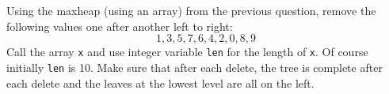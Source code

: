   Using the maxheap (using an array) from the previous question,
  remove the following values one after another left to right:
  \[
    1, 3, 5, 7, 6, 4, 2, 0, 8, 9
  \]
  Call the array \texttt{x} and use integer variable \texttt{len}
  for the length of \texttt{x}.
  Of course initially \texttt{len} is 10.
  Make sure that after each delete, the tree is complete after each delete and 
  the leaves
  at the lowest level are all on the left.
